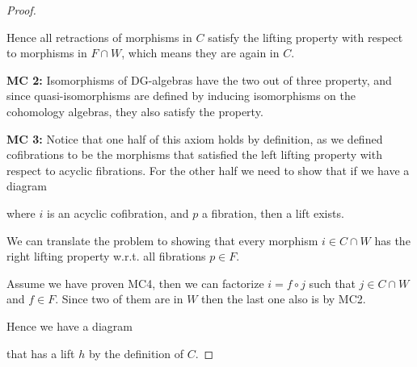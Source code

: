 \begin{proof}
\begin{center}
\begin{tikzpicture}[%
	cross line/.style={preaction={draw=white, -,line width=6pt}}]
\end{tikzpicture}
\end{center}
Hence all retractions of morphisms in $C$ satisfy the lifting property with respect to morphisms in $F\cap W$, which means they are again in $C$. 


\textbf{MC 2:} Isomorphisms of DG-algebras have the two out of three property, and since quasi-isomorphisms are defined by inducing isomorphisms on the cohomology algebras, they also satisfy the property. 
    
\textbf{MC 3:} Notice that one half of this axiom holds by definition, as we defined cofibrations to be the morphisms that satisfied the left lifting property with respect to acyclic fibrations. For the other half we need to show that if we have a diagram 
\begin{center}
\end{center}
where $i$ is an acyclic cofibration, and $p$ a fibration, then a lift exists. 
    
We can translate the problem to showing that every morphism $i\in C\cap W$ has the right lifting property w.r.t. all fibrations $p\in F$. 
    
Assume we have proven MC4, then we can factorize $i= f\circ j$ such that $j\in C\cap W$ and $f\in F$. Since two of them are in $W$ then the last one also is by MC2.

Hence we have a diagram 
\begin{center}
\end{center}
    
that has a lift $h$ by the definition of $C$. 


\end{proof}

